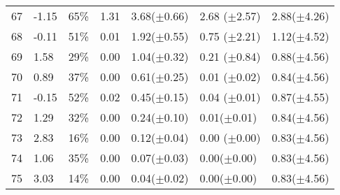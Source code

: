 \documentclass[review]{elsarticle}
\begin{document}
\begin{table*}[t!]
{\begin{tabular}{l|l|c|l|l|l|l}
67 & -1.15 & 65\% & 1.31   & 3.68($\pm$0.66)  & 2.68   ($\pm$2.57)     & 2.88($\pm$4.26)    \\
68 & -0.11 & 51\% & 0.01  & 1.92($\pm$0.55)  & 0.75   ($\pm$2.21)     & 1.12($\pm$4.52)  \\
69  & 1.58  & 29\% & 0.00        & 1.04($\pm$0.32)  & 0.21   ($\pm$0.84)    & 0.88($\pm$4.56) \\
70 & 0.89  & 37\% & 0.00        & 0.61($\pm$0.25)  & 0.01 ($\pm$0.02)    & 0.84($\pm$4.56)   \\
71 & -0.15 & 52\% & 0.02 & 0.45($\pm$0.15)  & 0.04 ($\pm$0.01)   & 0.87($\pm$4.55)   \\
72 & 1.29  & 32\%  & 0.00        & 0.24($\pm$0.10) & 0.01($\pm$0.01)  & 0.84($\pm$4.56) \\
73 & 2.83  & 16\%  & 0.00        & 0.12($\pm$0.04) & 0.00 ($\pm$0.00)  & 0.83($\pm$4.56) \\
74 & 1.06  & 35\% & 0.00        & 0.07($\pm$0.03) & 0.00($\pm$0.00)  & 0.83($\pm$4.56)  \\
75 & 3.03  & 14\% & 0.00        & 0.04($\pm$0.02) & 0.00($\pm$0.00) & 0.83($\pm$4.56) 
\end{tabular}
}
\end{table*}

 
\end{document}
